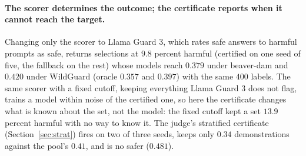 \documentclass{article} %
\begin{document}
\paragraph{The scorer determines the outcome; the certificate reports when it cannot reach the target.} Changing only the scorer to Llama Guard 3, which rates safe answers to harmful prompts as safe, returns selections at $9.8$ percent harmful (certified on one seed of five, the fallback on the rest) whose models reach $0.379$ under beaver-dam and $0.420$ under WildGuard (oracle $0.357$ and $0.397$) with the same $400$ labels. The same scorer with a fixed cutoff, keeping everything Llama Guard 3 does not flag, trains a model within noise of the certified one, so here the certificate changes what is known about the set, not the model: the fixed cutoff kept a set $13.9$ percent harmful with no way to know it. The judge's stratified certificate (Section~\ref{sec:strat}) fires on two of three seeds, keeps only $0.34$ demonstrations against the pool's $0.41$, and is no safer ($0.481$).
\end{document}
